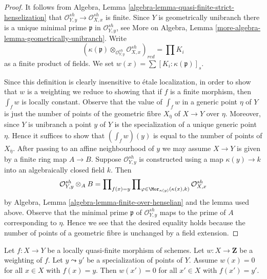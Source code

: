 \begin{proof}
It follows from Algebra, Lemma
\ref{algebra-lemma-quasi-finite-strict-henselization}
that $\mathcal{O}_{Y, y}^{sh} \to \mathcal{O}_{X, x}^{sh}$
is finite. Since $Y$ is geometrically unibranch
there is a unique minimal prime $\mathfrak p$ in
$\mathcal{O}_{Y, y}^{sh}$, see
More on Algebra, Lemma \ref{more-algebra-lemma-geometrically-unibranch}.
Write
$$
(\kappa(\mathfrak p) \otimes_{\mathcal{O}_{Y, y}^{sh}}
\mathcal{O}_{X, x}^{sh})_{red} =
\prod K_i
$$
as a finite product of fields.
We set $w(x) = \sum [K_i : \kappa(\mathfrak p)]_s$.

\medskip\noindent
Since this definition is clearly insensitive to \'etale localization,
in order to show that $w$ is a weighting we reduce to showing that if
$f$ is a finite morphism, then $\int_f w$ is locally constant.
Observe that the value of $\int_f w$ in a generic point $\eta$
of $Y$ is just the number of points of the geometric fibre
$X_{\overline{\eta}}$ of $X \to Y$ over $\eta$. Moreover, since
$Y$ is unibranch a point $y$ of $Y$ is the specialization of a unique
generic point $\eta$. Hence it suffices to show that $(\int_f w)(y)$
is equal to the number of points of $X_{\overline{\eta}}$.
After passing to an affine neighbourhood of $y$ we may assume
$X \to Y$ is given by a finite ring map $A \to B$. Suppose
$\mathcal{O}_{Y, y}^{sh}$ is constructed using a map
$\kappa(y) \to k$ into an algebraically closed field $k$.
Then
$$
\mathcal{O}_{Y, y}^{sh} \otimes_A B =
\prod\nolimits_{f(x) = y}
\prod\nolimits_{\varphi \in \Mor_{\kappa(y)}(\kappa(x), k)}
\mathcal{O}_{X, x}^{sh}
$$
by Algebra, Lemma \ref{algebra-lemma-finite-over-henselian}
and the lemma used above.
Observe that the minimal prime $\mathfrak p$ of $\mathcal{O}_{Y, y}^{sh}$
maps to the prime of $A$ corresponding to $\eta$. Hence we see that
the desired equality holds because the number of points of a geometric
fibre is unchanged by a field extension.
\end{proof}

\begin{lemma}
\label{lemma-weighting-specialization}
Let $f : X \to Y$ be a locally quasi-finite morphism of schemes.
Let $w : X \to \mathbf{Z}$ be a weighting of $f$.
Let $y \leadsto y'$ be a specialization of points of $Y$.
Assume $w(x) = 0$ for all $x \in X$ with $f(x) = y$. Then
$w(x') = 0$ for all $x' \in X$ with $f(x') = y'$.
\end{lemma}

